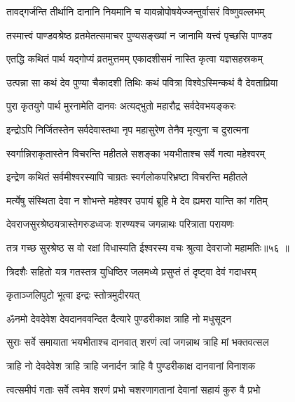 \twolineshloka
{तावद्गर्जन्ति तीर्थानि दानानि नियमानि च}
{यावन्नोपोषयेज्जन्तुर्वासरं विष्णुवल्लभम्}%

\twolineshloka
{तस्मात्त्वं पाण्डवश्रेष्ठ व्रतमेतत्समाचर}
{पुण्यसङ्ख्यां न जानामि यत्त्वं पृच्छसि पाण्डव}%

\twolineshloka
{एतद्धि कथितं पार्थ यद्गोप्यं व्रतमुत्तमम्}
{एकादशीसमं नास्ति कृत्वा यज्ञसहस्रकम्}%


\twolineshloka
{उत्पन्ना सा कथं देव पुण्या चैकादशी तिथिः}
{कथं पवित्रा विश्वेऽस्मिन्कथं वै देवताप्रिया}%


\twolineshloka
{पुरा कृतयुगे पार्थ मुरनामेति दानवः}
{अत्यद्भुतो महारौद्र सर्वदेवभयङ्करः}%

\twolineshloka
{इन्द्रोऽपि निर्जितस्तेन सर्वदेवास्तथा नृप}
{महासुरेण तेनैव मृत्युना च दुरात्मना}%

\twolineshloka
{स्वर्गान्निराकृतास्तेन विचरन्ति महीतले}
{सशङ्का भयभीताश्च सर्वे गत्वा महेश्वरम्}%

\twolineshloka
{इन्द्रेण कथितं सर्वमीश्वरस्यापि चाग्रतः}
{स्वर्गलोकपरिभ्रष्टा विचरन्ति  महीतले}%

\twolineshloka
{मर्त्येषु संस्थिता देवा न शोभन्ते महेश्वर}
{उपायं ब्रूहि मे देव ह्यमरा यान्ति कां गतिम्}%


\twolineshloka
{देवराजसुरश्रेष्ठयत्रास्तेगरुडध्वजः}
{शरण्यश्च जगन्नाथः परित्राता परायणः}%

\twolineshloka
{तत्र गच्छ सुरश्रेष्ठ स वो रक्षां विधास्यति}
{ईश्वरस्य वचः श्रुत्वा देवराजो महामतिः॥५६                          ॥}

\twolineshloka
{त्रिदशैः सहितो यत्र गतस्तत्र युधिष्ठिर}
{जलमध्ये प्रसुप्तं तं दृष्ट्वा देवं गदाधरम्}%

\onelineshloka
{कृताञ्जलिपुटो भूत्वा इन्द्रः स्तोत्रमुदीरयत्}%


\twolineshloka
{ॐनमो देवदेवेश देवदानववन्दित}
{दैत्यारे पुण्डरीकाक्ष त्राहि नो मधुसूदन}%

\twolineshloka
{सुराः सर्वे समायाता भयभीताश्च दानवात्}
{शरणं त्वां जगन्नाथ त्राहि मां भक्तवत्सल}%

\twolineshloka
{त्राहि नो देवदेवेश त्राहि त्राहि जनार्दन}
{त्राहि वै पुण्डरीकाक्ष दानवानां विनाशक}%

\twolineshloka
{त्वत्समीपं गताः सर्वे त्वमेव शरणं प्रभो}
{चशरणागतानां देवानां सहायं कुरु वै प्रभो}%


